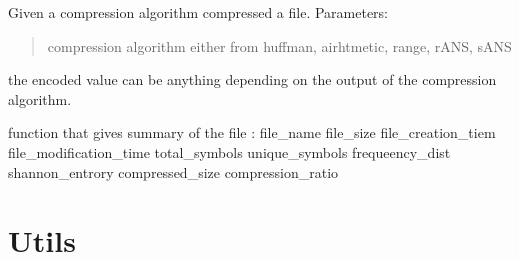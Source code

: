 \documentclass[letterpaper,10pt,english]{sphinxmanual}
\begin{document}
\begin{fulllineitems}

\begin{fulllineitems}
\label{\detokenize{file_compressor:file_compressor.FileCompressor.file_encode}}
\pysigstartsignatures
{}
\pysigstopsignatures
\sphinxAtStartPar
Given a compression algorithm compressed a file. 
Parameters:
\begin{quote}
\begin{description}
\sphinxAtStartPar
compression algorithm either from huffman, airhtmetic, range, rANS, sANS

\end{description}
\end{quote}
\begin{description}
\begin{description}
\sphinxAtStartPar
the encoded value can be anything depending on the output of the compression algorithm.

\end{description}

\end{description}

\end{fulllineitems}


\begin{fulllineitems}
\label{\detokenize{file_compressor:file_compressor.FileCompressor.summary}}
\pysigstartsignatures
{}
\pysigstopsignatures
\sphinxAtStartPar
function that gives summary of the file
:
file\_name
file\_size
file\_creation\_tiem
file\_modification\_time
total\_symbols
unique\_symbols
frequeency\_dist
shannon\_entrory
compressed\_size
compression\_ratio

\end{fulllineitems}


\end{fulllineitems}


\sphinxstepscope


\section{Utils}
\label{\detokenize{utils:utils}}\label{\detokenize{utils::doc}}
\end{document}
